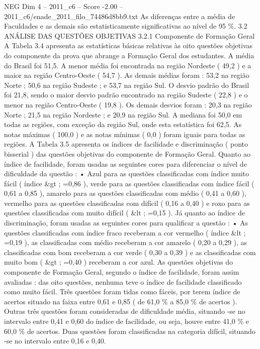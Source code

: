 \begin{textsample}{NEG Dim 4 – 2011\_c6 – Score -2.00 – 2011\_c6/enade\_2011\_filo\_74486d8bb9.txt}
As diferenças entre a média de Faculdades e as demais são estatisticamente significativas ao nível de 95 \%. 3.2 ANÁLISE DAS QUESTÕES OBJETIVAS 3.2.1 Componente de Formação Geral A Tabela 3.4 apresenta as estatísticas básicas relativas às oito questões objetivas do componente da prova que abrange a Formação Geral dos estudantes.
A média do Brasil foi 51,5.
A menor média foi encontrada na região Nordeste ( 49,2 ) e a maior na região Centro-Oeste ( 54,7 ).
As demais médias foram : 53,2 na região Norte ; 50,6 na região Sudeste ; e 53,7 na região Sul.
O desvio padrão do Brasil foi 21,8, sendo o maior desvio padrão encontrado na região Sudeste ( 22,8 ) e o menor na região Centro-Oeste ( 19,8 ).
Os demais desvios foram : 20,3 na região Norte ; 21,5 na região Nordeste ; e 20,9 na região Sul.
A mediana foi 50,0 em todas as regiões, com exceção da região Sul, onde esta estatística foi 62,5.
As notas máximas ( 100,0 ) e as notas mínimas ( 0,0 ) foram iguais para todas as regiões.
A Tabela 3.5 apresenta os índices de facilidade e discriminação ( ponto bisserial ) das questões objetivas do componente de Formação Geral.
Quanto ao índice de facilidade, foram usadas as seguintes cores para diferenciar o nível de dificuldade da questão : • Azul para as questões classificadas com índice muito fácil ( índice \&gt ; =0,86 ), verde para as questões classificadas com índice fácil ( 0,61 a 0,85 ), amarelo para as questões classificadas com médio ( 0,41 a 0,60 ), vermelho para as questões classificadas com difícil ( 0,16 a 0,40 ) e roxo para as questões classificadas com muito difícil ( \&lt ; =0,15 ).
Já quanto ao índice de discriminação, foram usadas as seguintes cores para qualificar a questão : • As questões classificadas com índice fraco receberam a cor vermelho ( índice \&lt ; =0,19 ), as classificadas com médio receberam a cor amarelo ( 0,20 a 0,29 ), as classificadas com bom receberam a cor verde ( 0,30 a 0,39 ) e as classificadas com muito bom ( \&gt ; =0,40 ) receberam a cor azul.
As questões objetivas do componente de Formação Geral, segundo o índice de facilidade, foram assim avaliadas : das oito questões, nenhuma teve o índice de facilidade classificado como muito fácil.
Três questões foram tidas como fáceis, por terem índice de acertos situado na faixa entre 0,61 e 0,85 ( de 61,0 \% a 85,0 \% de acertos ).
Outras três questões foram consideradas de dificuldade média, situando -se no intervalo entre 0,41 e 0,60 do índice de facilidade, ou seja, houve entre 41,0 \% e 60,0 \% de acertos.
Duas questões foram classificadas na categoria difícil, situando -se no intervalo entre 0,16 e 0,40.

\end{textsample}
